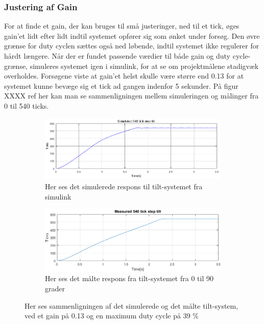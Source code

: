 \subsubsection{Justering af Gain}

For at finde et gain, der kan bruges til små justeringer, ned til et tick, øges gain'et lidt efter lidt indtil systemet opfører sig som ønket under forsøg. Den øvre grænse for duty cyclen sættes også ned løbende, indtil systemet ikke regulerer for hårdt længere. Når der er fundet passende værdier til både gain og duty cycle-grænse, simuleres systemet igen i simulink, for at se om projektmålene stadigvæk overholdes. Forsøgene viste at gain'et helst skulle være større end 0.13 for at systemet kunne bevæge sig et tick ad gangen indenfor 5 sekunder. På figur XXXX ref her kan man se sammenligningen mellem simuleringen og målinger fra 0 til 540 ticks.

\begin{figure}[t!]
    \centering
    \begin{subfigure}[t]{0.8\textwidth}
     \centering
        \includegraphics[width=1\textwidth]{Billeder/Simulated_Response_Tilt.png}
        \caption{Her ses det simulerede respons til tilt-systemet fra simulink}
        \label{fig:Simulated_Tilt}
    \end{subfigure}
    \begin{subfigure}[b]{0.8\textwidth}
     \centering
        \includegraphics[width=1\textwidth]{Billeder/Measured_Response_Tilt.PNG}
        \caption{Her ses det målte respons fra tilt-systemet fra 0 til 90 grader}
        \label{fig:Measured_Tilt}
    \end{subfigure}
    \caption{Her ses sammenligningen af det simulerede og det målte tilt-system, ved et gain på 0.13 og en maximum duty cycle på 39 $\%$}
\end{figure}

